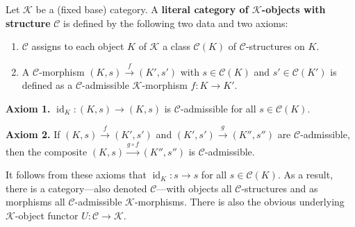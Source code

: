 Let $\mathcal{K}$ be a (fixed base) category. A \textbf{literal category of $\mathcal{K}$-objects with structure} $\mathcal{C}$ is defined by the following two data and two axioms:

\begin{enumerate}
  \item $\mathcal{C}$ assigns to each object $K$ of $\mathcal{K}$ a class $\mathcal{C}(K)$ of $\mathcal{C}$-structures on $K$.
  \item A $\mathcal{C}$-morphism $(K,s) \xrightarrow{f} (K',s')$ with $s \in \mathcal{C}(K)$ and $s' \in \mathcal{C}(K')$ is defined as a $\mathcal{C}$-admissible $\mathcal{K}$-morphism $f: K \to K'$.
\end{enumerate}

\textbf{Axiom 1.} $\operatorname{id}_K: (K,s) \to (K,s)$ is $\mathcal{C}$-admissible for all $s \in \mathcal{C}(K)$.

\textbf{Axiom 2.} If $(K,s) \xrightarrow{f} (K',s')$ and $(K',s') \xrightarrow{g} (K'',s'')$ are $\mathcal{C}$-admissible, then the composite $(K,s) \xrightarrow{g \circ f} (K'',s'')$ is $\mathcal{C}$-admissible.

It follows from these axioms that $\operatorname{id}_K: s \to s$ for all $s \in \mathcal{C}(K)$. As a result, there is a category—also denoted $\mathcal{C}$—with objects all $\mathcal{C}$-structures and as morphisms all $\mathcal{C}$-admissible $\mathcal{K}$-morphisms. There is also the obvious underlying $\mathcal{K}$-object functor $U: \mathcal{C} \to \mathcal{K}$.
